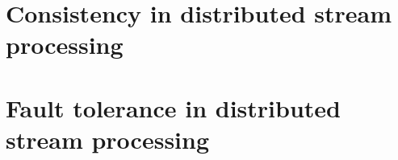 \section{Consistency in distributed stream processing}
\label{consistency_overview}


\section{Fault tolerance in distributed stream processing}
\label{phd-related-fault-tolerance}
